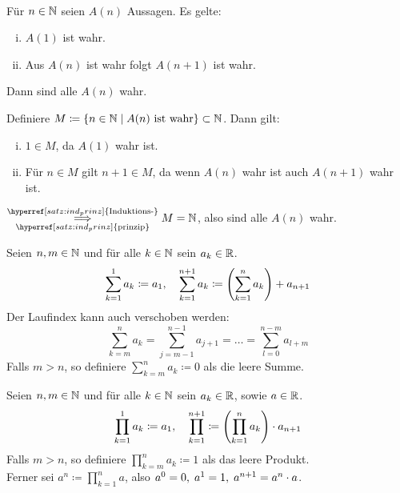 \documentclass[../ana1.tex]{subfiles}
\begin{document}
\begin{kor}\label{satz:vollst_ind}\leavevmode \\
	Für \(n \in \mathbb{N} \) seien \(A(n) \) Aussagen. Es gelte:
	\begin{enumerate}[(i)]
		\item \(A(1) \) ist wahr.
		\item Aus \(A(n) \) ist wahr folgt \(A(n+1) \) ist wahr.
	\end{enumerate}
	Dann sind alle \(A(n) \) wahr.
\end{kor}
\begin{bew}
	Definiere \(M \coloneqq \{n \in \mathbb{N}  \; \vert  \; A(n) \text{ ist wahr}\} \subset \mathbb{N} \). Dann gilt:
	\begin{enumerate}[(i)]
		\item \(1\in M \), da \(A(1) \) wahr ist.
		\item Für \(n\in M \) gilt \(n + 1 \in M \), da wenn \(A(n) \) wahr ist auch \(A(n + 1) \) wahr ist.
	\end{enumerate}
	\(\overunderset{\hyperref[satz:ind_prinz]{\text{Induktions-}}}{\hyperref[satz:ind_prinz]{\text{prinzip}}}{\implies} M = \N \), also sind alle \(A(n) \) wahr.
\end{bew}

\begin{defi*}[Summen]Seien \(n , m \in \mathbb{N} \) und für alle \(k \in \mathbb{N} \) sein \(a_{k} \in \mathbb{R} \).
	\[\sum_{k = 1}^{1} a_{k} \coloneqq a_{1} , \quad \sum_{k = 1}^{n + 1} a_{k} \coloneqq \left(\sum_{k = 1}^{n} a_{k} \right) + a_{n + 1} \]
	Der Laufindex kann auch verschoben werden:
	\[\sum_{k = m}^{n} a_{k} = \sum_{j = m - 1}^{n - 1} a_{j + 1} = \ldots = \sum_{l = 0}^{n - m} a_{l + m} \]
	Falls \(m > n \), so definiere \(\sum_{k = m}^{n} a_{k} \coloneqq 0 \) als die leere Summe.
\end{defi*}

\begin{defi*}[Produkte]Seien \(n , m \in \mathbb{N} \) und für alle \(k \in \mathbb{N} \) sein \(a_{k} \in \mathbb{R} \), sowie \(a \in \mathbb{R} \).
	\[\prod_{k = 1}^{1} a_{k} \coloneqq a_{1} , \quad \prod_{k = 1}^{n + 1} \coloneqq \left(\prod_{k = 1}^{n} a_{k} \right) \cdot a_{n + 1} \]
	Falls \(m > n \), so definiere \(\prod_{k = m}^{n} a_{k} \coloneqq 1 \) als das leere Produkt. \\
	Ferner sei \(a^{n} \coloneqq \prod_{k = 1}^{n} a \), also \(a^{0} = 0 ,  \; a^{1} = 1 ,  \; a^{n + 1} = a^{n} \cdot a \).
\end{defi*}
\end{document}
